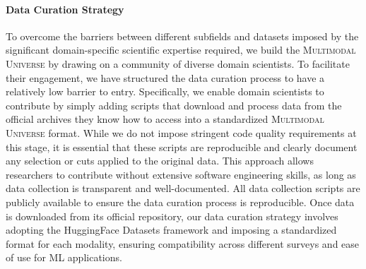 \documentclass[dvipsnames,table]{article}
\newcommand\pile{\textsc{Multimodal Universe}\xspace}
\begin{document}
\paragraph{Data Curation Strategy}
To overcome the barriers between different subfields and datasets imposed by the significant domain-specific scientific expertise required, we build the \pile by drawing on a community of diverse domain scientists. To facilitate their engagement, we have structured the data curation process to have a relatively low barrier to entry. Specifically, we enable domain scientists to contribute by simply adding scripts that download and process data from the official archives they know how to access into a standardized \pile format. While we do not impose stringent code quality requirements at this stage, it is essential that these scripts are reproducible and clearly document any selection or cuts applied to the original data. This approach allows researchers to contribute without extensive software engineering skills, as long as data collection is transparent and well-documented. All data collection scripts are publicly available to ensure the data curation process is reproducible. Once data is downloaded from its official repository, our data curation strategy involves adopting the HuggingFace Datasets framework and imposing a standardized format for each modality, ensuring compatibility across different surveys and ease of use for ML applications. 
\end{document}
